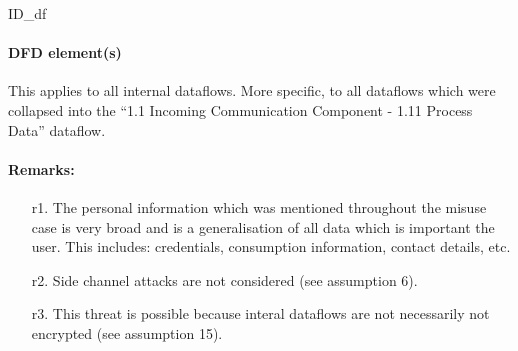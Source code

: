 ID\_df

\paragraph{DFD element(s)}

This applies to all internal dataflows. More specific, to all dataflows which
were collapsed into the ``1.1 Incoming Communication Component - 1.11 Process
Data'' dataflow.

\paragraph{Remarks:}
	\begin{enumerate}
         \item[r1.] The personal information which was mentioned throughout the
         misuse case is very broad and is a generalisation of all data which is
         important the user. This includes: credentials, consumption
         information, contact details, etc.
         \item[r2.] Side channel attacks are not considered (see assumption 6).
         \item[r3.] This threat is possible because interal dataflows are
         not necessarily not encrypted (see assumption 15).
    \end{enumerate}
